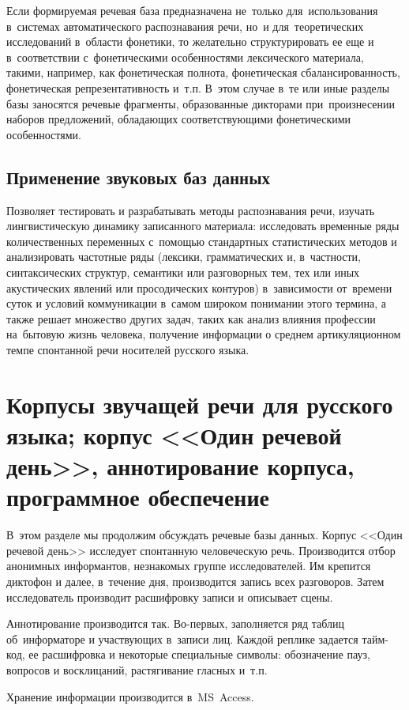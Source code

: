 \documentclass[12pt]{article}
\theoremstyle{definition}
\theoremstyle{remark}
\numberwithin{equation}{section}
\begin{document}
Если формируемая речевая база предназначена не~только для~использования
в~системах автоматического распознавания речи, но~и для~теоретических
исследований в~области фонетики, то желательно структурировать ее еще
и в~соответствии с~фонетическими особенностями лексического материала,
такими, например, как фонетическая полнота, фонетическая сбалансированность,
фонетическая репрезентативность и~т.п. В~этом случае в~те или иные разделы
базы заносятся речевые фрагменты, образованные дикторами при~произнесении
наборов предложений, обладающих соответствующими фонетическими особенностями.

\subsection{Применение звуковых баз данных}
Позволяет тестировать и разрабатывать методы распознавания речи,
изучать лингвистическую динамику записанного материала:
исследовать временные ряды количественных переменных с~помощью
стандартных статистических методов и анализировать частотные ряды
(лексики, грамматических и, в~частности, синтаксических структур,
семантики или разговорных тем, тех или иных акустических явлений или
просодических контуров) в~зависимости от~времени суток и условий
коммуникации в~самом широком понимании этого термина, а также решает
множество других задач, таких как анализ влияния профессии на~бытовую
жизнь человека, получение информации о среднем артикуляционном темпе
спонтанной речи носителей русского языка.

\section{Корпусы звучащей речи для русского языка; корпус <<Один речевой день>>,
аннотирование корпуса, программное обеспечение}
В~этом разделе мы продолжим обсуждать речевые базы данных. Корпус
<<Один речевой день>> исследует спонтанную человеческую речь.
Производится отбор анонимных информантов, незнакомых группе
исследователей. Им крепится диктофон и далее, в~течение дня,
производится запись всех разговоров. Затем исследователь производит
расшифровку записи и описывает сцены.

Аннотирование производится так. Во-первых, заполняется ряд таблиц
об~информаторе и участвующих в~записи лиц. Каждой реплике
задается тайм-код, ее расшифровка и некоторые специальные
символы: обозначение пауз, вопросов и восклицаний, растягивание
гласных и~т.п.

Хранение информации производится в~MS~Access.
\end{document}
